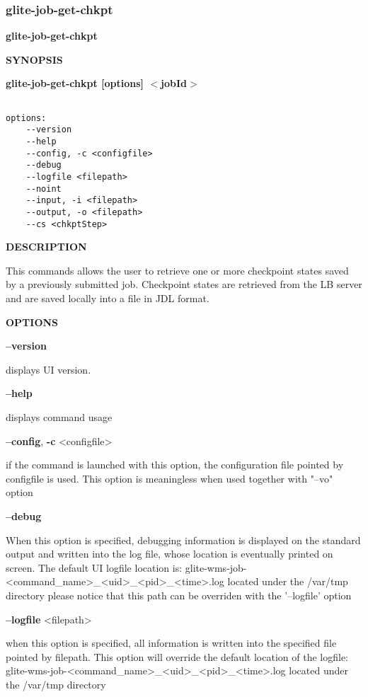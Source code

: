 \subsubsection{glite-job-get-chkpt}
\label{glite-job-get-chkpt}

\medskip
\textbf{glite-job-get-chkpt}
\smallskip


\medskip
\textbf{SYNOPSIS}
\smallskip

\textbf{glite-job-get-chkpt [options] $<$jobId$>$}
{\begin{verbatim}

options:
	--version
	--help
	--config, -c <configfile>
	--debug
	--logfile <filepath>
	--noint
	--input, -i <filepath>
	--output, -o <filepath>
	--cs <chkptStep>
\end{verbatim}

\medskip
\textbf{DESCRIPTION}
\smallskip


This commands allows the user to retrieve one or more checkpoint states saved by a previously submitted job.
Checkpoint states are retrieved from the LB server and are saved locally into a file in JDL format.

\medskip
\textbf{OPTIONS}
\smallskip

\textbf{--version}

displays UI version.

\textbf{--help}

displays command usage

\textbf{--config}, \textbf{-c} <configfile>

if the command is launched with this option, the configuration file pointed by configfile is used. This option is meaningless when used together with "--vo" option

\textbf{--debug}

When this option is specified, debugging information is displayed on the standard output and written into the log file, whose location is eventually printed on screen.
The default UI logfile location is:
glite-wms-job-<command\_name>\_<uid>\_<pid>\_<time>.log  located under the /var/tmp directory
please notice that this path can be overriden with the '--logfile' option

\textbf{--logfile} <filepath>

when this option is specified, all information is written into the specified file pointed by filepath.
This option will override the default location of the logfile:
glite-wms-job-<command\_name>\_<uid>\_<pid>\_<time>.log  located under the /var/tmp directory

}
